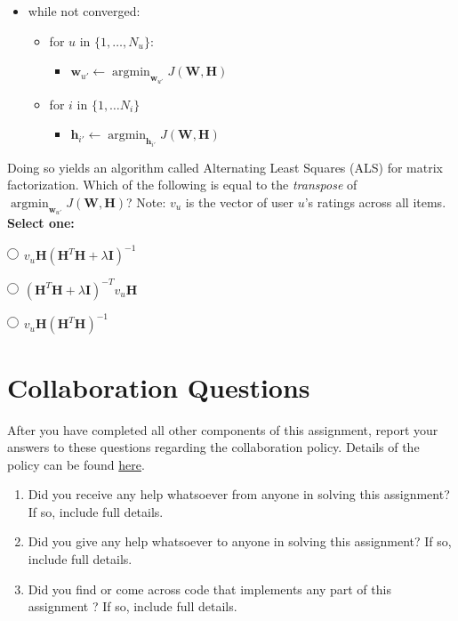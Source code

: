 \documentclass[11pt,addpoints,answers]{exam}
\renewcommand{\circle}{\tikz\draw[black] (0,0) circle (1ex);}
\newcommand{\hv}{\mathbf{h}}
\newcommand{\wv}{\mathbf{w}}
\newcommand{\Hv}{\mathbf{H}}
\newcommand{\Iv}{\mathbf{I}}
\newcommand{\Wv}{\mathbf{W}}
\newcommand \argmin {\operatorname*{argmin}}
\begin{document}
\begin{questions}
\begin{parts}
     \begin{itemize}
         \item while not converged:
         \begin{itemize}
            \item for $u$ in $\{1, \ldots, N_u\}$:
            \begin{itemize}
                \item $\wv_{u'} \leftarrow \argmin_{\wv_{u'}} J(\Wv, \Hv)$
            \end{itemize}
            \item for $i$ in $\{1, \ldots N_i\}$
             \begin{itemize}
                \item $\hv_{i'} \leftarrow \argmin_{\hv_{i'}} J(\Wv, \Hv)$
            \end{itemize}
         \end{itemize}
     \end{itemize}
     
     Doing so yields an algorithm called Alternating Least Squares (ALS) for matrix factorization. Which of the following is equal to the \emph{transpose} of $\argmin_{\wv_{u'}} J(\Wv, \Hv)$? Note: $v_u$ is the vector of user $u$'s ratings across all items. \\
     \textbf{Select one:}

        \begin{list}{}
        \item $\circle$ $v_u\Hv(\Hv^T\Hv+\lambda \Iv)^{-1}$
        \item $\circle$ $(\Hv^T\Hv+\lambda \Iv)^{-T}v_u\Hv$
        \item $\circle$ $v_u\Hv(\Hv^T\Hv)^{-1}$
    \end{list}  
    
    

\end{parts}
\end{questions}

\newpage
\section{Collaboration Questions}
After you have completed all other components of this assignment, report your answers to these questions regarding the collaboration policy. Details of the policy can be found \href{http://www.cs.cmu.edu/~mgormley/courses/10601/syllabus.html}{here}.
\begin{enumerate}
    \item Did you receive any help whatsoever from anyone in solving this assignment? If so, include full details.
    \item Did you give any help whatsoever to anyone in solving this assignment? If so, include full details.
    \item Did you find or come across code that implements any part of this assignment ? If so, include full details.
\end{enumerate}

\begin{your_solution}[height=6cm]

\end{your_solution}
\end{document}
